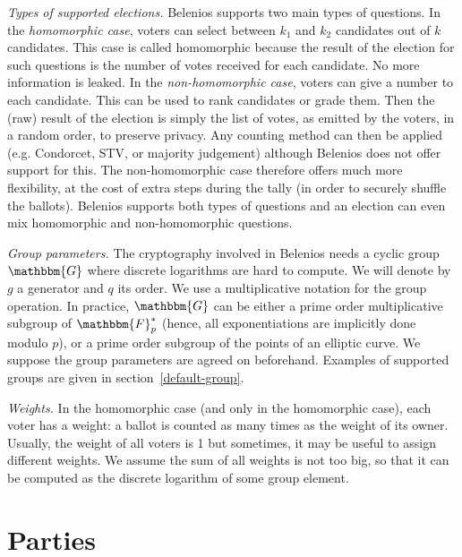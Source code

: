 \documentclass[a4paper]{article}
\newcommand{\F}{\mathbbm{F}}
\newcommand{\G}{\mathbbm{G}}
\begin{document}
{\it Types of supported elections.}
Belenios supports two main types of questions.
In the \emph{homomorphic case}, voters can select between $k_1$ and
$k_2$ candidates out of $k$ candidates. This case is called
homomorphic because the result of the election for such questions is
the number of votes received for each candidate. No more information
is leaked.
In the \emph{non-homomorphic case}, voters can give a number to each
candidate. This can be used to rank candidates or grade them. Then the
(raw) result of the election is simply the list of votes, as emitted
by the voters, in
a random order, to preserve privacy.
Any counting method can then be  applied
(e.g. Condorcet, STV, or majority judgement) although Belenios does
not offer support for this.
The non-homomorphic case  therefore offers much more flexibility, at
the cost of extra steps during the tally (in order to securely shuffle
the ballots).
Belenios supports both types of questions and an election can even
mix homomorphic and non-homomorphic questions.
\medskip

{\it Group parameters.}
The cryptography involved in Belenios needs a cyclic group $\G$ where
discrete logarithms are hard to compute. We will denote by $g$ a
generator and $q$ its order. We use a multiplicative notation for the
group operation. In practice, $\G$ can be either a prime order multiplicative
subgroup of $\F^*_p$ (hence, all exponentiations are implicitly done
modulo $p$), or a prime order subgroup of the points of an elliptic curve. We
suppose the group parameters are agreed on
beforehand. Examples of supported groups are given in
section~\ref{default-group}.

\medskip

{\it Weights.}  In the homomorphic case (and only in the homomorphic
case), each voter has a weight: a
ballot is counted as many times as the weight of its owner. Usually,
the weight of all voters is 1 but sometimes, it may be useful to
assign different weights. We assume the sum of all weights is not too
big, so that it can be computed as the discrete logarithm of some
group element.

\section{Parties}

\newcommand{\pk}{\texttt{public\_key}}
\newcommand{\sk}{\texttt{private\_key}}
\newcommand{\proof}{\texttt{proof}}
\newcommand{\iproof}{\texttt{iproof}}
\newcommand{\ciphertext}{\texttt{ciphertext}}
\end{document}
